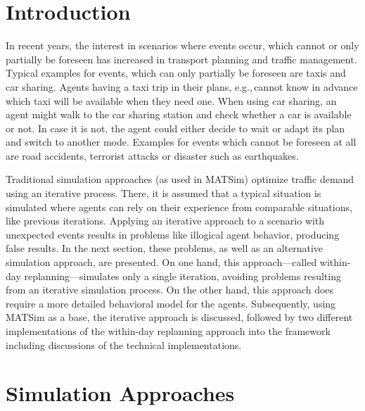 \section{Introduction}
In recent years, the interest in scenarios where events occur, which cannot or only partially be foreseen has increased in transport planning and traffic management. Typical examples for events, which can only partially be foreseen are taxis and car sharing. Agents having a taxi trip in their plans, e.g.,\,cannot know in advance which taxi will be available when they need one. When using car sharing, an agent might walk to the car sharing station and check whether a car is available or not. In case it is not, the agent could either decide to wait or adapt its plan and switch to another mode. Examples for events which cannot be foreseen at all are road accidents, terrorist attacks or disaster such as earthquakes.

Traditional simulation approaches (as used in MATSim) optimize traffic demand using an iterative process. There, it is assumed that a typical situation is simulated where agents can rely on their experience from comparable situations, like previous iterations. Applying an iterative approach to a scenario with unexpected events results in problems like illogical agent behavior, producing false results. In the next section, these problems, as well as an alternative simulation approach, are presented. On one hand, this approach---called within-day replanning---simulates only a single iteration, avoiding problems resulting from an iterative simulation process. On the other hand, this approach does require a more detailed behavioral model for the agents. Subsequently, using MATSim as a base, the iterative approach is discussed, followed by two different implementations of the within-day replanning approach into the framework including discussions of the technical implementations.

\section{Simulation Approaches} 
\label{sec:SimulationApproaches}
